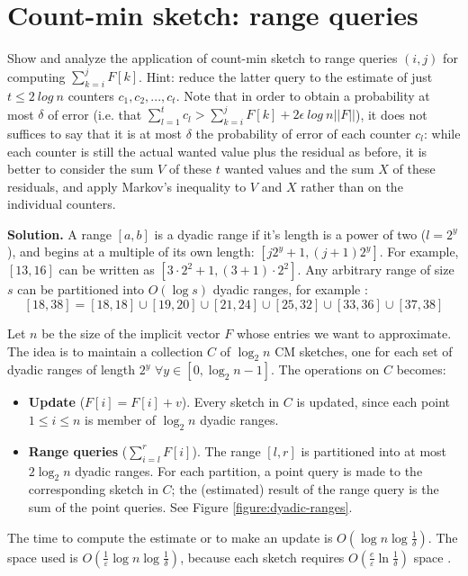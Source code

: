 \section{Count-min sketch: range queries}

Show and analyze the application of count-min sketch to range queries $(i,j)$ for computing  $\sum^j_{k=i} F[k]$. Hint: reduce the latter query to the estimate of just $t \leq 2\ log\ n$ counters $c_1,c_2,...,c_t$. Note that in order to obtain a probability at most $\delta$ of error (i.e. that $\sum^t_{l=1}c_l > \sum^j_{k=i}F[k] + 2\epsilon\ log\ n ||F||$), it does not suffices to say that it is at most $\delta$ the probability of error of each counter $c_l$: while each counter is still the actual wanted value plus the residual as before, it is better to consider the sum $V$ of these $t$ wanted values and the sum $X$ of these residuals, and apply Markov’s inequality to $V$ and $X$ rather than on the individual counters.

\vspace{1cm}
\noindent
\textbf{Solution.} A range $[a,b]$ is a dyadic range if it's length is a power of two ($l=2^y$), and begins at a multiple of its own length: $[j2^y+1, (j+1)2^y]$. For example, $[13,16]$ can be written as $[3\cdot 2^2+1,(3+1)\cdot 2^2]$. Any arbitrary range of size $s$ can be partitioned into $O(\log s)$ dyadic ranges, for example \cite{Cormode11}:
$$[18,38]=[18,18]\cup[19,20]\cup[21,24]\cup[25,32]\cup[33,36]\cup[37,38]$$

Let $n$ be the size of the implicit vector $F$ whose entries we want to approximate. The idea is to maintain a collection $C$ of $\log_2 n$ CM sketches, one for each set of dyadic ranges of length $2^y$ $\forall y\in [0, \log_2 n-1]$. The operations on $C$ becomes:
\begin{itemize}
  \item \textbf{Update} ($F[i] = F[i] + v$). Every sketch in $C$ is updated, since each point $1 \leq i \leq n$ is member of $\log_2 n$ dyadic ranges.
  \item \textbf{Range queries} ($\sum_{i=l}^rF[i]$). The range $[l,r]$ is partitioned into at most $2\log_2 n$ dyadic ranges. For each partition, a point query is made to the corresponding sketch in $C$; the (estimated) result of the range query is the sum of the point queries. See Figure \ref{figure:dyadic-ranges}.
\end{itemize}

The time to compute the estimate or to make an update is $O(\log n\log\frac{1}{\delta})$. The space used is $O(\frac{1}{\varepsilon}\log n\log\frac{1}{\delta})$, because each sketch requires $O(\frac{e}{\varepsilon}\ln\frac{1}{\delta})$ space \cite{Cormode05}.

